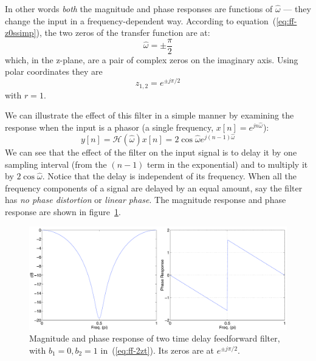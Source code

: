 In other words \emph{both} the magnitude and phase responses are
functions of $\hat{\omega}$ --- they change the input in a
frequency-dependent way. According to equation~(\ref{eq:ff-z0ssimp}), the
two zeros of the transfer function are at:
\begin{equation*}
\hat{\omega}= \pm\frac{\pi}{2}
\end{equation*}
which, in the z-plane, are a pair of complex zeros on the imaginary axis. Using polar
coordinates they are
\begin{equation}
z_{1,2} = e^{\pm j\pi/2}
\end{equation}
with $r=1$. 

We can illustrate the effect of this filter in a simple manner by
examining the response when the input is a phasor (a single frequency,
$x[n]=e^{jn\hat{\omega}}$):
\begin{equation}
  y[n]= \mathcal{H}(\hat{\omega})x[n] 
      = 2\cos\hat{\omega} e^{j(n-1)\hat{\omega}} \label{eq:ff-2zt}
\end{equation}
We can see that the effect of the filter on the input signal is to
delay it by one sampling interval (from the $(n-1)$ term in the
exponential) and to multiply it by $2\cos\hat{\omega}$. Notice that
the delay is independent of its frequency. When all the frequency
components of a signal are delayed by an equal amount, say the filter
has \emph{no phase distortion} or \emph{linear phase}. The magnitude response and phase response are
shown in figure~\ref{fig:ff-exp2zh90-r1}.

\begin{figure}
\centerline{\includegraphics[width=6in]{ch-fir/ffexp_2tdelay_h90}}
\caption[Frequency response of two time delay feedforward
filter]{Magnitude and phase response of two time delay feedforward filter, with
$b_1=0, b_2=1$ in~(\protect\ref{eq:ff-2zt}).  Its zeros are at $e^{\pm
j\pi/2}$.
\label{fig:ff-exp2zh90-r1}}
\end{figure}

